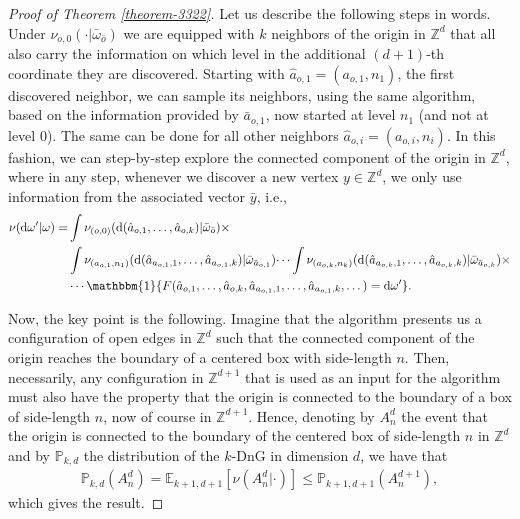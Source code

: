 \documentclass[a4paper, oneside, 11pt]{amsart}
\theoremstyle{definition}
\renewcommand{\P}{\mathbb{P}}
\newcommand{\1}{\mathbbm{1}}
\newcommand{\E}{\mathbb{E}}
\newcommand{\0}{\mathbf{o}}
\renewcommand{\d}{\mathrm{d}}
\newcommand{\Z}{\mathbb{Z}}
\numberwithin{equation}{section}
\begin{document}
\begin{proof}[Proof of Theorem \ref{theorem-3322}]
Let us describe the following steps in words. Under $\nu_{o,0}(\cdot|\bar\omega_{\bar o})$ we are equipped with $k$ neighbors of the origin in $\Z^d$ that all also carry the information on which level in the additional $(d+1)$-th coordinate they are discovered. Starting with $\hat a_{o,1}=(a_{o,1},n_1)$, the first discovered neighbor, we can sample its neighbors, using the same algorithm, based on the information provided by $\bar a_{o,1}$, now started at level $n_1$ (and not at level $0$). The same can be done for all other neighbors $\hat a_{o,i}=(a_{o,i},n_i)$. In this fashion, we can step-by-step explore the connected component of the origin in $\Z^d$, where in any step, whenever we discover a new vertex $y\in \Z^d$, we only use information from the associated vector $\bar y$, i.e., 
\begin{align*}
\nu(\d \omega'|\omega)=&\int \nu_{(o,0)}(\d(\hat a_{o,1},\dots,\hat a_{o,k})|\bar \omega_{\bar o})\times\\
&\int\nu_{(a_{o,1},n_1)}(\d(\hat a_{a_{o,1},1},\dots,\hat a_{a_{o,1},k})|\bar \omega_{\bar a_{o,1}})\dots \int\nu_{(a_{o,k},n_k)}(\d(\hat a_{a_{o,k},1},\dots,\hat a_{a_{o,k},k})|\bar \omega_{\bar a_{o,k}})\times\\
&\cdots \1\{F(\hat a_{o,1},\dots,\hat a_{o,k},\hat a_{a_{o,1},1},\dots,\hat a_{a_{o,1},k},\dots)=\d \omega'\}.
\end{align*}

Now, the key point is the following. Imagine that the algorithm presents us a configuration of open edges in $\Z^d$ such that the connected component of the origin reaches the boundary of a centered box with side-length $n$. Then, necessarily, any configuration in $\Z^{d+1}$ that is used as an input for the algorithm must also have the property that the origin is connected to the boundary of a box of side-length $n$, now of course in  $\Z^{d+1}$. Hence, denoting by $A^{d}_n$ the event that the origin is connected to the boundary of the centered box of side-length $n$ in $\Z^d$ and by $\P_{k,d}$ the distribution of the $k$-DnG in dimension $d$, we have that 
\begin{align*}
\P_{k,d}(A^d_n)=\E_{k+1,d+1}[\nu(A^d_n|\cdot)]\le \P_{k+1,d+1}(A^{d+1}_n), 
\end{align*}
which gives the result.
\end{proof}
\end{document}
